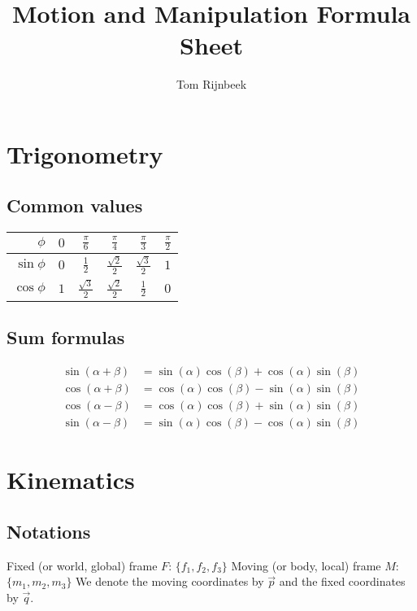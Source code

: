 \documentclass{article}
\title{Motion and Manipulation Formula Sheet}
\author{Tom Rijnbeek}
\theoremstyle{definition}
\begin{document}
\section{Trigonometry}

\subsection{Common values}
\begin{tabular}{r|ccccc}
$\phi$ & $0$ & $\frac{\pi}{6}$ & $\frac{\pi}{4}$ & $\frac{\pi}{3}$ & $\frac{\pi}{2}$ \\ \hline
$\sin \phi$ & $0$ & $\frac{1}{2}$ & $\frac{\sqrt{2}}{2}$ & $\frac{\sqrt{3}}{2}$ & $1$ \\
$\cos \phi$ & $1$ & $\frac{\sqrt{3}}{2}$ & $\frac{\sqrt{2}}{2}$ & $\frac{1}{2}$ & $0$
\end{tabular}

\subsection{Sum formulas}
\begin{align*}
	\sin(\alpha + \beta) &= \sin(\alpha)\cos(\beta) + \cos(\alpha)\sin(\beta) \\
	\cos(\alpha + \beta) &= \cos(\alpha)\cos(\beta) - \sin(\alpha)\sin(\beta) \\
	\cos(\alpha - \beta) &= \cos(\alpha)\cos(\beta) + \sin(\alpha)\sin(\beta) \\
	\sin(\alpha - \beta) &= \sin(\alpha)\cos(\beta) - \cos(\alpha)\sin(\beta)
\end{align*}

\section{Kinematics}

\subsection{Notations}
Fixed (or world, global) frame $F$: $\{f_1, f_2, f_3\}$\newline
Moving (or body, local) frame $M$: $\{m_1, m_2, m_3\}$\newline
We denote the moving coordinates by $\vec{p}$ and the fixed coordinates by $\vec{q}$.
\end{document}
